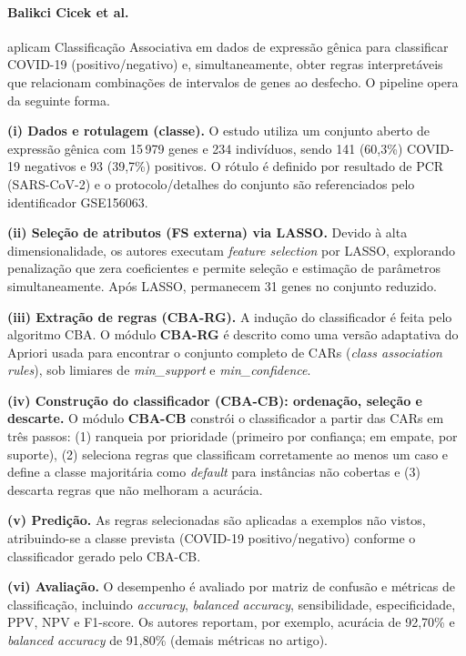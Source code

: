 \paragraph*{Balikci Cicek et al.} 

 aplicam Classificação Associativa em dados de expressão gênica para classificar COVID-19 (positivo/negativo) e, simultaneamente, obter regras interpretáveis que relacionam combinações de intervalos de genes ao desfecho. O pipeline opera da seguinte forma.

\textbf{(i) Dados e rotulagem (classe).}
O estudo utiliza um conjunto aberto de expressão gênica com 15\,979 genes e 234 indivíduos, sendo 141 (60,3\%) COVID-19 negativos e 93 (39,7\%) positivos.
O rótulo é definido por resultado de PCR (SARS-CoV-2) e o protocolo/detalhes do conjunto são referenciados pelo identificador GSE156063. 

\textbf{(ii) Seleção de atributos (FS externa) via LASSO.}
Devido à alta dimensionalidade, os autores executam \textit{feature selection} por LASSO, explorando penalização que zera coeficientes e permite seleção e estimação de parâmetros simultaneamente. 
Após LASSO, permanecem 31 genes no conjunto reduzido. 

\textbf{(iii) Extração de regras (CBA-RG).}
A indução do classificador é feita pelo algoritmo CBA. O módulo \textbf{CBA-RG} é descrito como uma versão adaptativa do Apriori usada para encontrar o conjunto completo de CARs (\textit{class association rules}), sob limiares de \textit{min\_support} e \textit{min\_confidence}. 

\textbf{(iv) Construção do classificador (CBA-CB): ordenação, seleção e descarte.}
O módulo \textbf{CBA-CB} constrói o classificador a partir das CARs em três passos: (1) ranqueia por prioridade (primeiro por confiança; em empate, por suporte), (2) seleciona regras que classificam corretamente ao menos um caso e define a classe majoritária como \textit{default} para instâncias não cobertas e (3) descarta regras que não melhoram a acurácia.

\textbf{(v) Predição.}
As regras selecionadas são aplicadas a exemplos não vistos, atribuindo-se a classe prevista (COVID-19 positivo/negativo) conforme o classificador gerado pelo CBA-CB. 

\textbf{(vi) Avaliação.}
O desempenho é avaliado por matriz de confusão e métricas de classificação, incluindo \textit{accuracy}, \textit{balanced accuracy}, sensibilidade, especificidade, PPV, NPV e F1-score. 
Os autores reportam, por exemplo, acurácia de 92,70\% e \textit{balanced accuracy} de 91,80\% (demais métricas no artigo). 


